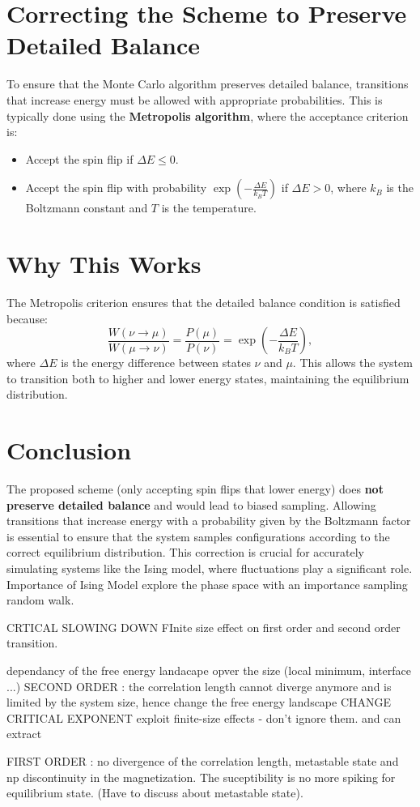 \documentclass[ansiapaper]{report}
\begin{document}
\begin{multicols}{3}
\section*{Correcting the Scheme to Preserve Detailed Balance}

To ensure that the Monte Carlo algorithm preserves detailed balance, transitions that increase energy must be allowed with appropriate probabilities. This is typically done using the \textbf{Metropolis algorithm}, where the acceptance criterion is:
\begin{itemize}
    \item Accept the spin flip if \( \Delta E \leq 0 \).
    \item Accept the spin flip with probability \( \exp\left(-\frac{\Delta E}{k_B T}\right) \) if \( \Delta E > 0 \), where \( k_B \) is the Boltzmann constant and \( T \) is the temperature.
\end{itemize}

\section*{Why This Works}

The Metropolis criterion ensures that the detailed balance condition is satisfied because:
\[
\frac{W(\nu \to \mu)}{W(\mu \to \nu)} = \frac{P(\mu)}{P(\nu)} = \exp\left(-\frac{\Delta E}{k_B T}\right),
\]
where \( \Delta E \) is the energy difference between states \( \nu \) and \( \mu \). This allows the system to transition both to higher and lower energy states, maintaining the equilibrium distribution.

\section*{Conclusion}

The proposed scheme (only accepting spin flips that lower energy) does \textbf{not preserve detailed balance} and would lead to biased sampling. Allowing transitions that increase energy with a probability given by the Boltzmann factor is essential to ensure that the system samples configurations according to the correct equilibrium distribution. This correction is crucial for accurately simulating systems like the Ising model, where fluctuations play a significant role.
Importance of Ising Model
explore the phase space with an importance sampling random walk. 

CRTICAL SLOWING DOWN
FInite size effect on first order and second order transition.

dependancy of the free energy landacape opver the size (local minimum, interface ...)
SECOND ORDER : the correlation length cannot diverge anymore and is limited by the system size, hence change the free energy landscape
CHANGE CRITICAL EXPONENT exploit finite-size effects - don’t ignore them. and can extract

FIRST ORDER : no divergence of the correlation length, metastable state and np discontinuity in the magnetization. The suceptibility is no more spiking for equilibrium state. (Have to discuss about metastable state). 


\end{multicols} 
\end{document}
